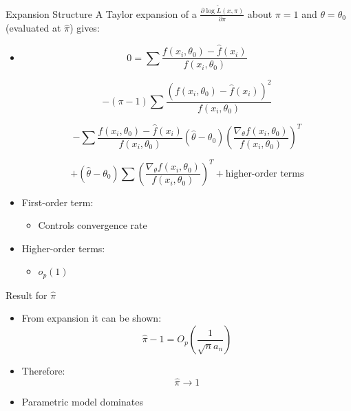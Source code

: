 \begin{frame}{Expansion Structure}
A Taylor expansion of a $\frac{\partial \log \tilde L(x,\pi)}{\partial \pi}$ about $\pi = 1$ and $\theta = \theta_0$ (evaluated at $\hat\pi$) gives:
\begin{itemize}
    \item 
\small
\[
0 = \sum \frac{f(x_i,\theta_0) - \hat{f}(x_i)}{f(x_i,\theta_0)}
\]

\[
- (\pi - 1)\sum \frac{\left(f(x_i,\theta_0) - \hat{f}(x_i)\right)^2}{f(x_i,\theta_0)}
\]

\[
- \sum \frac{f(x_i,\theta_0) - \hat{f}(x_i)}{f(x_i,\theta_0)}
(\hat{\theta} - \theta_0)
\left(
\frac{\nabla_\theta f(x_i,\theta_0)}{f(x_i,\theta_0)}
\right)^T
\]

\[
+ (\hat{\theta} - \theta_0)\sum
\left(
\frac{\nabla_\theta f(x_i,\theta_0)}{f(x_i,\theta_0)}
\right)^T
+ \text{higher-order terms}
\]
\normalsize


    \item First-order term:
    \begin{itemize}
        \item Controls convergence rate
    \end{itemize}

    \item Higher-order terms:
    \begin{itemize}
        \item $o_p(1)$
    \end{itemize}
\end{itemize}
\end{frame}


\begin{frame}{Result for $\hat{\pi}$}
\begin{itemize}
    \item From expansion it can be shown:
    \[
    \hat{\pi}-1 = O_p\left(\frac{1}{\sqrt{n}a_n}\right)
    \]

    \item Therefore:
    \[
    \hat{\pi} \to 1
    \]

    \item Parametric model dominates
\end{itemize}
\end{frame}


